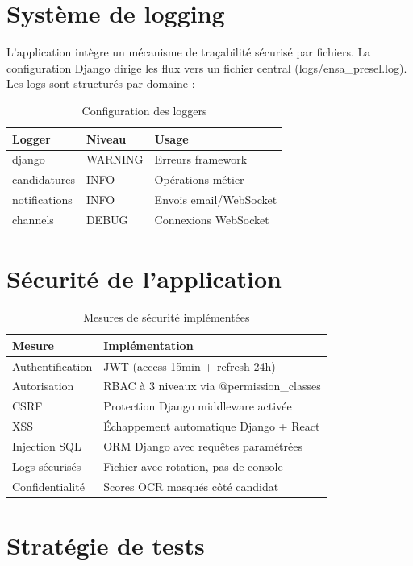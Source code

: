 \section{Système de logging}
L'application intègre un mécanisme de traçabilité sécurisé par fichiers. La configuration Django dirige les flux vers un fichier central (logs/ensa\_presel.log). Les logs sont structurés par domaine :

\begin{table}[htbp]
\centering
\caption{Configuration des loggers}
\label{tab:loggers}
\begin{tabular}{p{3cm} p{3cm} p{8cm}}
\toprule
\textbf{Logger} & \textbf{Niveau} & \textbf{Usage} \\
\midrule
django & WARNING & Erreurs framework \\
candidatures & INFO & Opérations métier \\
notifications & INFO & Envois email/WebSocket \\
channels & DEBUG & Connexions WebSocket \\
\bottomrule
\end{tabular}
\end{table}

\section{Sécurité de l'application}
\begin{table}[htbp]
\centering
\caption{Mesures de sécurité implémentées}
\label{tab:securite}
\begin{tabular}{p{4cm} p{10cm}}
\toprule
\textbf{Mesure} & \textbf{Implémentation} \\
\midrule
Authentification & JWT (access 15min + refresh 24h) \\
Autorisation & RBAC à 3 niveaux via @permission\_classes \\
CSRF & Protection Django middleware activée \\
XSS & Échappement automatique Django + React \\
Injection SQL & ORM Django avec requêtes paramétrées \\
Logs sécurisés & Fichier avec rotation, pas de console \\
Confidentialité & Scores OCR masqués côté candidat \\
\bottomrule
\end{tabular}
\end{table}

\section{Stratégie de tests}
